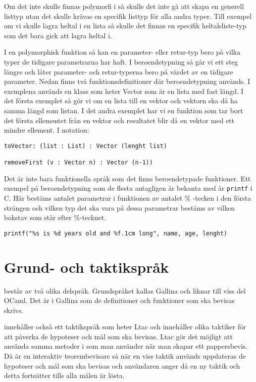 Om det inte skulle finnas polymorfi i \coq så skulle det inte gå att skapa en
generell listtyp utan det skulle krävas en specifik listtyp för alla andra
typer. Till exempel om vi skulle lagra heltal i en lista så skulle det finnas
en specifik heltalsliste-typ som det bara gick att lagra heltal i.

I en polymorphisk funktion så kan en parameter- eller retur-typ bero på vilka
typer de tidigare parametrarna har haft. I beroendetypning så går vi ett steg
längre och låter parameter- och retur-typerna bero på värdet av en tidigare
parameter. Nedan finns två funktionsdefinitioner där beroendetypning används. I
exemplena används en klass som heter Vector som är en lista med fast längd. I
det första exemplet så gör vi om en lista till en vektor och vektorn ska då ha
samma längd som listan. I det andra exemplet har vi en funktion som tar bort
det första ellementet från en vektor och resultatet blir då en vektor med ett
mindre ellement. I \coq notation:
\begin{verbatim}
toVector: (list : List) : Vector (lenght list)

removeFirst (v : Vector n) : Vector (n-1))
\end{verbatim}

Det är inte bara funktionella språk som det finns beroendetypade funktioner.
Ett exempel på beroendetypning som de flesta antagligen är bekanta med är
\texttt{printf} i C. Här bestäms antalet parametrar i funktionen av antalet
\% -tecken i den första strängen och vilken typ det ska vara på dessa
parametrar bestäms av vilken bokstav som står efter \%-tecknet.
\begin{verbatim}
printf("%s is %d years old and %f.1cm long", name, age, lenght)
\end{verbatim}


\section{Grund- och taktikspråk}
\coq består av två olika delspråk. Grundspråket kallas Gallina och liknar till
viss del OCaml. Det är i Gallina som de definitioner och funktioner som ska
bevisas skrivs.

\coq innehåller också ett taktikspråk som heter Ltac och innehåller olika
taktiker för att påverka de hypoteser och mål som ska bevisas. Ltac gör det
möjligt att använda samma metoder i \coq som man använder när man skapar ett
pappersbevis. Då \coq är en interaktiv teorembevisare så när en viss taktik
används uppdateras de hypoteser och mål som ska bevisas och användaren
anger då en ny taktik och detta fortsätter tills alla målen är lösta.

